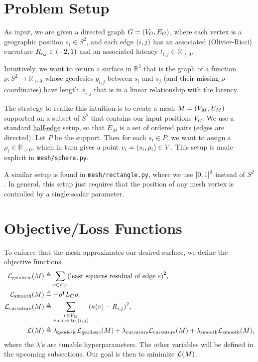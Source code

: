 \documentclass[10pt]{article}
\newcommand*\delimeter[3]{
	\ensuremath{\mathopen{}\left#2 #1\right#3\mathclose{}{\vphantom{\left#2 #1\right#3}}}
}
\newcommand*\pof[1]{\delimeter{#1}{(}{)}}
\newcommand*\ooint[1]{\delimeter{#1}{(}{)}}
\newcommand*\ccint[1]{\delimeter{#1}{[}{]}}
\begin{document}
	\pagestyle{empty}

	\section{Problem Setup}

	As input, we are given a directed graph \(G = \pof{V_G, E_G}\), where each vertex is a geographic position \(s_i \in S^2\), and each edge \(\pof{i, j}\) has an associated (Olivier-Ricci) curvature \(R_{i, j} \in \ooint{-2, 1}\) and an associated latency \(t_{i, j} \in \mathbb{R}_{\ge 0}\).

	Intuitively, we want to return a surface in \(\mathbb{R}^3\) that is the graph of a function \(\rho : S^2 \to \mathbb{R}_{> 0}\) whose geodesics \(g_{i, j}\) between \(s_i\) and \(s_j\) (and their missing \(\rho\)-coordinates) have length \(\phi_{i, j}\) that is in a linear relationship with the latency.

	The strategy to realize this intuition is to create a mesh \(M = \pof{V_M, E_M}\) supported on a subset of \(S^2\) that contains our input positions \(V_G\). We use a standard \href{https://en.wikipedia.org/wiki/Doubly_connected_edge_list}{half-edge} setup, so that \(E_M\) is a set of ordered pairs (edges are directed). Let \(P\) be the support. Then for each \(s_i \in P\), we want to assign a \(\rho_i \in \mathbb{R}_{> 0}\), which in turn gives a point \(v_i = \pof{s_i, \rho_i} \in V\). This setup is made explicit in \texttt{mesh/sphere.py}.

	A similar setup is found in \texttt{mesh/rectangle.py}, where we use \(\ccint{0, 1}^2\) instead of \(S^2\). In general, this setup just requires that the position of any mesh vertex is controlled by a single scalar parameter.

	\section{Objective/Loss Functions}

	To enforce that the mesh approximates our desired surface, we define the objective functions \begin{align*}
		\mathcal{L}_{\mathrm{geodesic}}\pof{M} &\triangleq \sum_{e \in E_G} \pof{\text{least squares residual of edge \(e\)}}^2, \\
		\mathcal{L}_{\mathrm{smooth}}\pof{M} &\triangleq -\rho^\intercal L_C\rho, \\
		\mathcal{L}_{\mathrm{curvature}}\pof{M} &\triangleq \sum_{\substack{v \in V_M \\ \text{\(v\) close to \(\pof{i, j}\)}}} \pof{\kappa\pof{v} - R_{i, j}}^2, \\
		\mathcal{L}\pof{M} &\triangleq \lambda_{\mathrm{geodesic}}\mathcal{L}_{\mathrm{geodesic}}\pof{M} + \lambda_{\mathrm{curvature}}\mathcal{L}_{\mathrm{curvature}}\pof{M} + \lambda_{\mathrm{smooth}}\mathcal{L}_{\mathrm{smooth}}\pof{M},
	\end{align*} where the \(\lambda\)'s are tunable hyperparameters. The other variables will be defined in the upcoming subsections. Our goal is then to minimize \(\mathcal{L}\pof{M}\).
\end{document}
